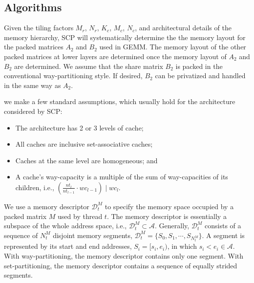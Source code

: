 \subsection{Algorithms}\label{subsec:formal}

Given the tiling factors $M_r$, $N_r$, $K_c$, $M_c$, $N_c$,
and architectural details of the memory hierarchy,
SCP will systematically determine the
the memory layout for the packed matrices $A_2$ and $B_2$ used in GEMM.
The memory layout of the other packed matrices at
lower layers are determined once the memory layout of
$A_2$ and $B_2$ are determined.
We assume that the share matrix $B_2$ is packed
in the conventional way-partitioning style.
If desired, $B_2$ can be privatized and handled in the same way as $A_2$.

we make a few standard assumptions, which usually
hold for the architecture considered by SCP:
\begin{itemize}
\item The architecture has 2 or 3 levels of cache; %
\item All caches are inclusive set-associative caches; %
\item Caches at the same level are homogeneous; and %
\item A cache's way-capacity is a multiple of the sum of way-capacities of its children,
i.e., $(\frac{nt_l}{nt_{l-1}} \cdot wc_{l-1}) \mid wc_l$.
\end{itemize}

We use a memory descriptor $\mathcal{D}_t^M$ to specify 
the memory space occupied by a 
packed matrix $M$ used by thread $t$.
The memory descriptor is essentially a subspace of
the whole address space, i.e., $\mathcal{D}_t^M \subset \mathcal{A}$.
Generally, $\mathcal{D}_t^M$ consists of a sequence of $N_t^M$ disjoint memory segments,
$\mathcal{D}_t^M = \{ S_0, S_1, \cdots, S_{N_t^M}\}$.
A segment is represented by its start and end addresses, $S_i = [s_i, e_i)$,
in which $s_i < e_i \in \mathcal{A}$.
With way-partitioning, the memory descriptor contains only one segment.
With set-partitioning,
the memory descriptor contains a sequence of equally strided segments.

